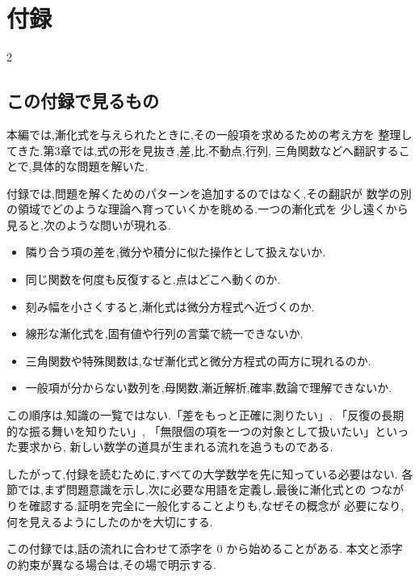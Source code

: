 
\chapter{付録}
\begin{multicols*}{2}

\section*{この付録で見るもの}

本編では,漸化式を与えられたときに,その一般項を求めるための考え方を
整理してきた.第3章では,式の形を見抜き,差,比,不動点,行列,
三角関数などへ翻訳することで,具体的な問題を解いた.

付録では,問題を解くためのパターンを追加するのではなく,その翻訳が
数学の別の領域でどのような理論へ育っていくかを眺める.一つの漸化式を
少し遠くから見ると,次のような問いが現れる.

\begin{itemize}
  \item 隣り合う項の差を,微分や積分に似た操作として扱えないか.
  \item 同じ関数を何度も反復すると,点はどこへ動くのか.
  \item 刻み幅を小さくすると,漸化式は微分方程式へ近づくのか.
  \item 線形な漸化式を,固有値や行列の言葉で統一できないか.
  \item 三角関数や特殊関数は,なぜ漸化式と微分方程式の両方に現れるのか.
  \item 一般項が分からない数列を,母関数,漸近解析,確率,数論で理解できないか.
\end{itemize}

この順序は,知識の一覧ではない.「差をもっと正確に測りたい」,
「反復の長期的な振る舞いを知りたい」,
「無限個の項を一つの対象として扱いたい」といった要求から,
新しい数学の道具が生まれる流れを追うものである.

したがって,付録を読むために,すべての大学数学を先に知っている必要はない.
各節では,まず問題意識を示し,次に必要な用語を定義し,最後に漸化式との
つながりを確認する.証明を完全に一般化することよりも,なぜその概念が
必要になり,何を見えるようにしたのかを大切にする.

この付録では,話の流れに合わせて添字を $0$ から始めることがある.
本文と添字の約束が異なる場合は,その場で明示する.













\end{multicols*}
